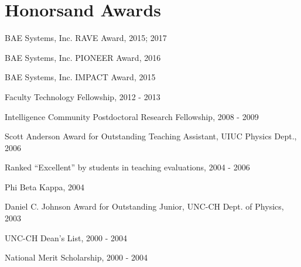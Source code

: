 \section{\sc Honors\newline and Awards} %
\begin{list2}
\item[-] BAE Systems, Inc. RAVE Award, 2015; 2017
\item[-] BAE Systems, Inc. PIONEER Award, 2016
\item[-] BAE Systems, Inc. IMPACT Award, 2015
\item[-] Faculty Technology Fellowship, 2012 - 2013
\item[-] Intelligence Community Postdoctoral Research Fellowship, 2008 - 2009
\item[-] Scott Anderson Award for Outstanding Teaching Assistant, UIUC Physics Dept., 2006
\item[-] Ranked ``Excellent'' by students in teaching evaluations, 2004 - 2006
\item[-] Phi Beta Kappa, 2004
\item[-] Daniel C. Johnson Award for Outstanding Junior, UNC-CH Dept. of Physics, 2003
\item[-] UNC-CH Dean's List, 2000 - 2004
\item[-] National Merit Scholarship, 2000 - 2004
\end{list2}

